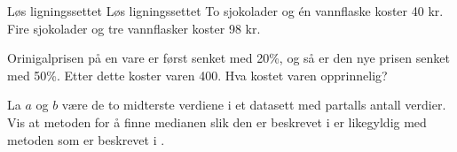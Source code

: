 Løs ligningssettet
Løs ligningssettet
\newpage
{}
To sjokolader og én vannflaske koster 40 kr.\\
Fire sjokolader og tre vannflasker koster 98 kr.

\newpage
{}
Orinigalprisen på en vare er først senket med 20\%, og så er den nye prisen senket med 50\%. Etter dette koster varen 400. Hva kostet varen opprinnelig?

La $ a $ og $ b $ være de to midterste verdiene i et datasett med partalls antall verdier. Vis at metoden for å finne medianen slik den er beskrevet i  er likegyldig med metoden som er beskrevet i .




